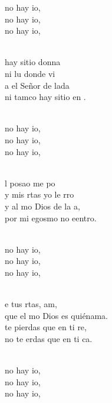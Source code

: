 \begin{cancion}%
	\begin{chorus}%
	 no hay io, \\
	no hay io, \\
	no hay io, \\
	\end{chorus}%
	\jump\\
	hay sitio donna\\
	ni lu donde vi\\
	a el Señor de lada\\
	ni tamco hay sitio en .\\\jump\\
	\begin{chorus}%
	 no hay io, \\
	no hay io, \\
	no hay io, \\
	\end{chorus}%
	\jump\\
	l posao me po\\
	y mis rtas yo le rro\\
	y al mo Dios de la a,\\
	por mi egosmo no eentro.\\\jump\\
	\begin{chorus}%
	 no hay io, \\
	no hay io, \\
	no hay io, \\
	\end{chorus}%
	\jump\\
	e tus rtas, am,\\
	que el mo Dios es quiénama.\\
	te pierdas que en ti re,\\
	no te erdas que en ti ca.\\\jump\\
	\begin{chorus}%
	 no hay io, \\
	no hay io, \\
	no hay io, \\
	\end{chorus}%
	\jump\\
\end{cancion}%
